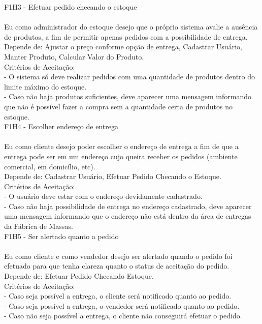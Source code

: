 F1H3 - Efetuar pedido checando o estoque\\
\\
\tab Eu como administrador do estoque desejo que o próprio sistema avalie a ausência de produtos, a fim de permitir apenas pedidos com a possibilidade de entrega.\\
\tab Depende de: Ajustar o preço conforme opção de entrega, Cadastrar Usuário, Manter Produto, Calcular Valor do Produto.\\
\tab Critérios de Aceitação:\\
\tab - O sistema só deve realizar pedidos com uma quantidade de produtos dentro do limite máximo do estoque. \\
\tab - Caso não haja produtos suficientes, deve aparecer uma mensagem informando que não é possível fazer a compra sem a quantidade certa de produtos no estoque.\\


F1H4 - Escolher endereço de entrega\\
\\
\tab Eu como cliente desejo poder escolher o endereço de entrega a fim de que a entrega pode ser em um endereço cujo queira receber os pedidos (ambiente comercial, em domicílio, etc).\\
\tab Depende de: Cadastrar Usuário, Efetuar Pedido Checando o Estoque.\\
\tab Critérios de Aceitação:\\
\tab - O usuário deve estar com o endereço devidamente cadastrado. \\
\tab - Caso não haja possibilidade de entrega no endereço cadastrado, deve aparecer uma mensagem informando que o endereço não está dentro da área de entregas da Fábrica de Massas.\\


F1H5 - Ser alertado quanto a pedido\\
\\
\tab Eu como cliente e como vendedor desejo ser alertado quando o pedido foi efetuado para que tenha clareza quanto o status de aceitação do pedido.\\
\tab Depende de: Efetuar Pedido Checando Estoque.\\
\tab Critérios de Aceitação:\\
\tab - Caso seja possível a entrega, o cliente será notificado quanto ao pedido. \\
\tab - Caso seja possível a entrega, o vendedor será notificado quanto ao pedido. \\
\tab - Caso não seja possível a entrega, o cliente não conseguirá efetuar o pedido. \\



